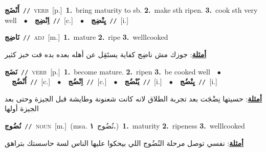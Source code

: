 \documentclass[10pt,a4paper,twoside]{article} %
\begin{document}
\begin{multicols}{2}
{\setlength\topsep{0pt}\textbf{\foreignlanguage{arabic}{أَنْضَج}}\ {\color{gray}\texttt{//}\color{black}}\ \textsc{verb}\ [p.]\ \textbf{1.}~bring maturity to sb.  \textbf{2.}~make sth ripen.  \textbf{3.}~cook sth very well\ \ $\bullet$\ \ \setlength\topsep{0pt}\textbf{\foreignlanguage{arabic}{اِنْضِج}}\ {\color{gray}\texttt{//}\color{black}}\ [c.]\ \ $\bullet$\ \ \setlength\topsep{0pt}\textbf{\foreignlanguage{arabic}{يِنْضِج}}\ {\color{gray}\texttt{//}\color{black}}\ [i.]\ } \vspace{2mm}

{\setlength\topsep{0pt}\textbf{\foreignlanguage{arabic}{نَاضِج}}\ {\color{gray}\texttt{//}\color{black}}\ \textsc{adj}\ [m.]\ \textbf{1.}~mature  \textbf{2.}~ripe  \textbf{3.}~welllcooked\  \begin{flushright}\color{gray}\foreignlanguage{arabic}{\textbf{\underline{\foreignlanguage{arabic}{أمثلة}}}: جوزك مش ناضِج كفاية يستَقِل عن أهله بعده بده فت خبز كثير}\end{flushright}\color{black}} \vspace{2mm}

{\setlength\topsep{0pt}\textbf{\foreignlanguage{arabic}{نَضَج}}\ {\color{gray}\texttt{//}\color{black}}\ \textsc{verb}\ [p.]\ \textbf{1.}~become mature.  \textbf{2.}~ripen  \textbf{3.}~be cooked well\ \ $\bullet$\ \ \setlength\topsep{0pt}\textbf{\foreignlanguage{arabic}{اُنْضُج}}\ {\color{gray}\texttt{//}\color{black}}\ [c.]\ \ $\bullet$\ \ \setlength\topsep{0pt}\textbf{\foreignlanguage{arabic}{اِنْضُج}}\ {\color{gray}\texttt{//}\color{black}}\ [c.]\ \ $\bullet$\ \ \setlength\topsep{0pt}\textbf{\foreignlanguage{arabic}{يُنْضُج}}\ {\color{gray}\texttt{//}\color{black}}\ [i.]\ \ $\bullet$\ \ \setlength\topsep{0pt}\textbf{\foreignlanguage{arabic}{يِنْضُج}}\ {\color{gray}\texttt{//}\color{black}}\ [i.]\  \begin{flushright}\color{gray}\foreignlanguage{arabic}{\textbf{\underline{\foreignlanguage{arabic}{أمثلة}}}: حسيتها نِضْجَت بعد تجربة الطلاق لانه كانت شعنونة وطايشة قبل الجيزة وحتى بعد الجيزة أولها}\end{flushright}\color{black}} \vspace{2mm}

{\setlength\topsep{0pt}\textbf{\foreignlanguage{arabic}{نُضُوج}}\ {\color{gray}\texttt{//}\color{black}}\ \textsc{noun}\ [m.]\ \color{gray}(msa. \foreignlanguage{arabic}{نُضُوج}~\foreignlanguage{arabic}{\textbf{١.}})\color{black}\ \textbf{1.}~maturity  \textbf{2.}~ripeness  \textbf{3.}~welllcooked\  \begin{flushright}\color{gray}\foreignlanguage{arabic}{\textbf{\underline{\foreignlanguage{arabic}{أمثلة}}}: نفسي توصل مرحلة النُضُوج اللي بيحكوا عليها الناس لسة حاسستك بتراهق}\end{flushright}\color{black}} \vspace{2mm}


\end{multicols}
\end{document}
